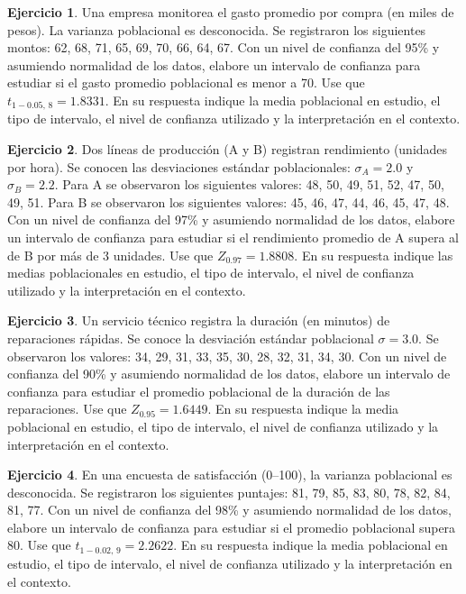 \documentclass[
  11pt,
]{book}
\theoremstyle{definition}
\theoremstyle{definition}
\theoremstyle{definition}
\newtheorem{exercise}{Ejercicio}[chapter]
\theoremstyle{definition}
\theoremstyle{remark}
\begin{document}
\begin{exercise}
Una empresa monitorea el gasto promedio por compra (en miles de pesos). La varianza poblacional es desconocida. Se registraron los siguientes montos: 62, 68, 71, 65, 69, 70, 66, 64, 67. Con un nivel de confianza del 95\% y asumiendo normalidad de los datos, elabore un intervalo de confianza para estudiar si el gasto promedio poblacional es menor a 70. Use que \(t_{1-0.05,\,8} = 1.8331\). En su respuesta indique la media poblacional en estudio, el tipo de intervalo, el nivel de confianza utilizado y la interpretación en el contexto.
\end{exercise}

\begin{exercise}
Dos líneas de producción (A y B) registran rendimiento (unidades por hora). Se conocen las desviaciones estándar poblacionales: \(\sigma_A = 2.0\) y \(\sigma_B = 2.2\). Para A se observaron los siguientes valores: 48, 50, 49, 51, 52, 47, 50, 49, 51. Para B se observaron los siguientes valores: 45, 46, 47, 44, 46, 45, 47, 48. Con un nivel de confianza del 97\% y asumiendo normalidad de los datos, elabore un intervalo de confianza para estudiar si el rendimiento promedio de A supera al de B por más de 3 unidades. Use que \(Z_{0.97} = 1.8808\). En su respuesta indique las medias poblacionales en estudio, el tipo de intervalo, el nivel de confianza utilizado y la interpretación en el contexto.
\end{exercise}

\begin{exercise}
Un servicio técnico registra la duración (en minutos) de reparaciones rápidas. Se conoce la desviación estándar poblacional \(\sigma = 3.0\). Se observaron los valores: 34, 29, 31, 33, 35, 30, 28, 32, 31, 34, 30. Con un nivel de confianza del 90\% y asumiendo normalidad de los datos, elabore un intervalo de confianza para estudiar el promedio poblacional de la duración de las reparaciones. Use que \(Z_{0.95} = 1.6449\). En su respuesta indique la media poblacional en estudio, el tipo de intervalo, el nivel de confianza utilizado y la interpretación en el contexto.
\end{exercise}

\begin{exercise}
En una encuesta de satisfacción (0--100), la varianza poblacional es desconocida. Se registraron los siguientes puntajes: 81, 79, 85, 83, 80, 78, 82, 84, 81, 77. Con un nivel de confianza del 98\% y asumiendo normalidad de los datos, elabore un intervalo de confianza para estudiar si el promedio poblacional supera 80. Use que \(t_{1-0.02,\,9} = 2.2622\). En su respuesta indique la media poblacional en estudio, el tipo de intervalo, el nivel de confianza utilizado y la interpretación en el contexto.
\end{exercise}
\end{document}
